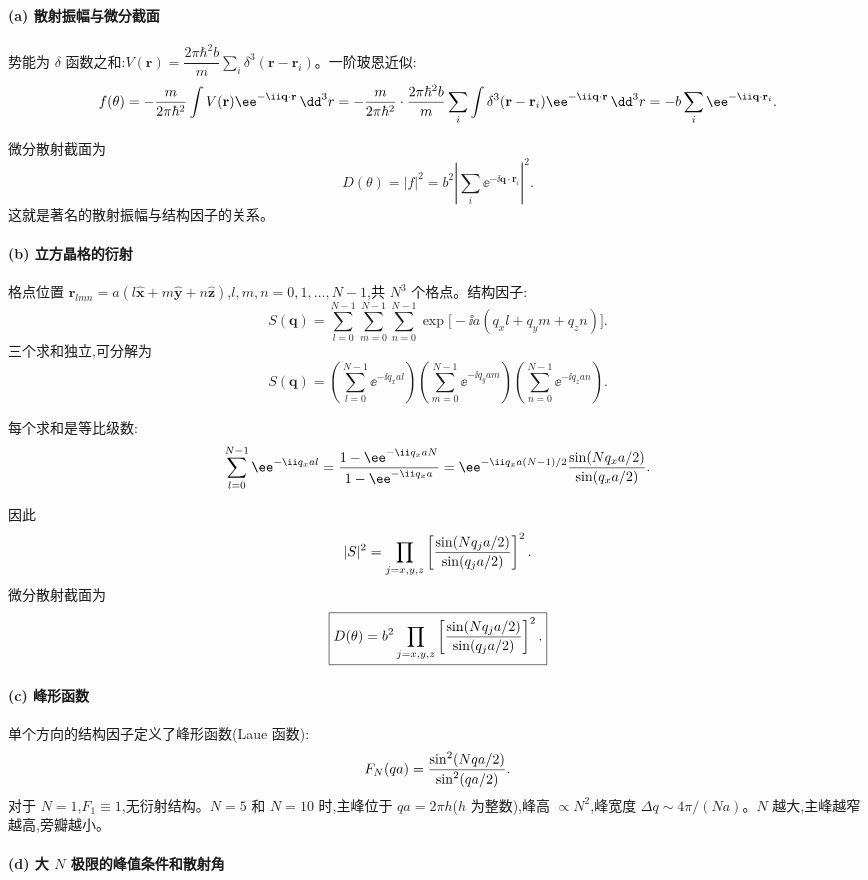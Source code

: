 \begin{solution}
\paragraph{(a) 散射振幅与微分截面}

势能为 $\delta$ 函数之和:$V(\mathbf r)=\dfrac{2\pi\hbar^2 b}{m}\sum_i\delta^3(\mathbf r-\mathbf r_i)$。一阶玻恩近似:
\[
f(\theta)=-{m\over2\pi\hbar^2}\int V(\mathbf r)\ee^{-\ii\mathbf q\cdot\mathbf r}\,\dd^3r
=-{m\over2\pi\hbar^2}\cdot{2\pi\hbar^2 b\over m}\sum_i\int\delta^3(\mathbf r-\mathbf r_i)\ee^{-\ii\mathbf q\cdot\mathbf r}\,\dd^3r
=-b\sum_i \ee^{-\ii\mathbf q\cdot\mathbf r_i}.
\]

微分散射截面为
\[
\boxed{D(\theta)=|f|^2=b^2\left|\sum_i \ee^{-\ii\mathbf q\cdot\mathbf r_i}\right|^2.}
\]
这就是著名的散射振幅与结构因子的关系。

\paragraph{(b) 立方晶格的衍射}

格点位置 $\mathbf r_{lmn}=a(l\hat{\mathbf x}+m\hat{\mathbf y}+n\hat{\mathbf z})$,$l,m,n=0,1,\ldots,N-1$,共 $N^3$ 个格点。结构因子:
\[
S(\mathbf q)=\sum_{l=0}^{N-1}\sum_{m=0}^{N-1}\sum_{n=0}^{N-1}
\exp\bigl[-\ii a(q_x l+q_y m+q_z n)\bigr].
\]
三个求和独立,可分解为
\[
S(\mathbf q)=\left(\sum_{l=0}^{N-1}\ee^{-\ii q_x a l}\right)
\left(\sum_{m=0}^{N-1}\ee^{-\ii q_y a m}\right)
\left(\sum_{n=0}^{N-1}\ee^{-\ii q_z a n}\right).
\]

每个求和是等比级数:
\[
\sum_{l=0}^{N-1}\ee^{-\ii q_x a l}
={1-\ee^{-\ii q_x a N}\over1-\ee^{-\ii q_x a}}
=\ee^{-\ii q_x a(N-1)/2}{\sin(N q_x a/2)\over\sin(q_x a/2)}.
\]

因此
\[
|S|^2=\prod_{j=x,y,z}\left[{\sin(N q_j a/2)\over\sin(q_j a/2)}\right]^2.
\]
微分散射截面为
\[
\boxed{D(\theta)=b^2\prod_{j=x,y,z}\left[{\sin(N q_j a/2)\over\sin(q_j a/2)}\right]^2.}
\]

\paragraph{(c) 峰形函数}

单个方向的结构因子定义了峰形函数(Laue 函数):
\[
F_N(q a)={\sin^2(N q a/2)\over\sin^2(q a/2)}.
\]
对于 $N=1$,$F_1\equiv1$,无衍射结构。$N=5$ 和 $N=10$ 时,主峰位于 $qa=2\pi h$($h$ 为整数),峰高 $\propto N^2$,峰宽度 $\Delta q\sim 4\pi/(Na)$。$N$ 越大,主峰越窄越高,旁瓣越小。

\paragraph{(d) 大 $N$ 极限的峰值条件和散射角}


\end{solution}
